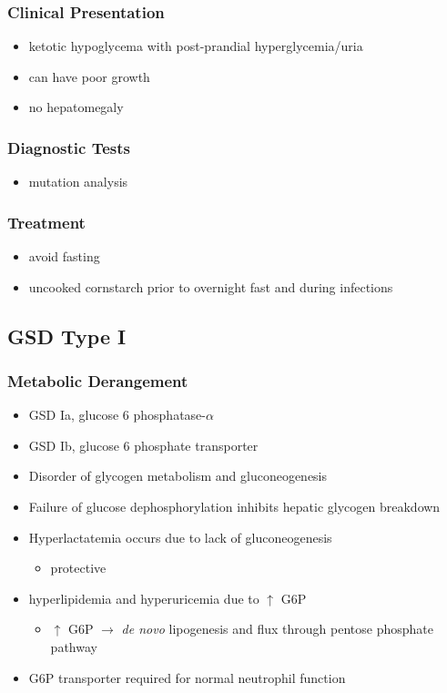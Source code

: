 \documentclass{scrartcl}
\begin{document}
\subsubsection{Clinical Presentation}
\label{sec:org19a6f7a}
\begin{itemize}
\item ketotic hypoglycema with post-prandial hyperglycemia/uria
\item can have poor growth
\item no hepatomegaly
\end{itemize}

\subsubsection{Diagnostic Tests}
\label{sec:orgd83bb44}
\begin{itemize}
\item mutation analysis
\end{itemize}
\subsubsection{Treatment}
\label{sec:orgb75d133}
\begin{itemize}
\item avoid fasting
\item uncooked cornstarch prior to overnight fast and during infections
\end{itemize}
\subsection{GSD Type I}
\label{sec:orgf22d6a4}
\subsubsection{Metabolic Derangement}
\label{sec:orgbb132a6}
\begin{itemize}
\item GSD Ia, glucose 6 phosphatase-\(\alpha\)
\item GSD Ib, glucose 6 phosphate transporter
\item Disorder of glycogen metabolism and gluconeogenesis
\item Failure of glucose dephosphorylation inhibits hepatic glycogen breakdown
\item Hyperlactatemia occurs due to lack of gluconeogenesis
\begin{itemize}
\item protective
\end{itemize}
\item hyperlipidemia and hyperuricemia due to \(\uparrow\) G6P
\begin{itemize}
\item \(\uparrow\) G6P \(\to\) \emph{de novo} lipogenesis and flux through pentose phosphate pathway
\end{itemize}
\item G6P transporter required for normal neutrophil function
\end{itemize}
\end{document}
